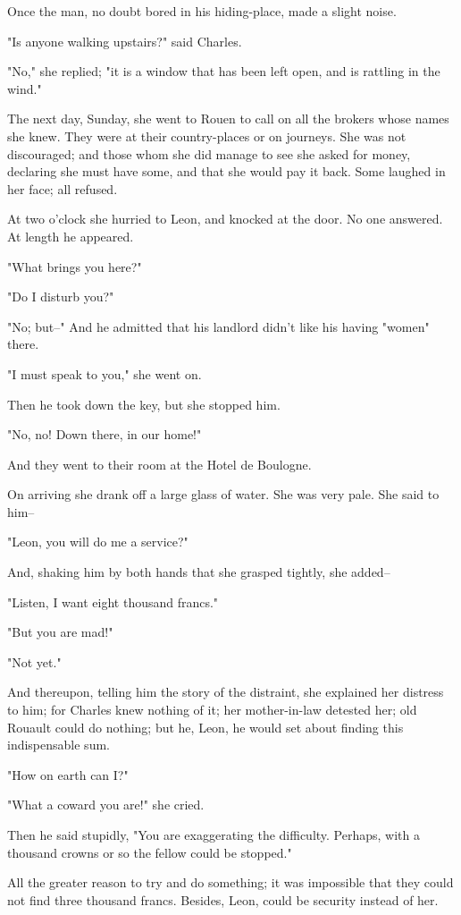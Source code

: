 \documentclass[11pt,twocolumn]{ltugboat}
\begin{document}
Once the man, no doubt bored in his hiding-place, made a slight noise.

"Is anyone walking upstairs?" said Charles.

"No," she replied; "it is a window that has been left open, and is
rattling in the wind."

The next day, Sunday, she went to Rouen to call on all the brokers whose
names she knew. They were at their country-places or on journeys. She
was not discouraged; and those whom she did manage to see she asked for
money, declaring she must have some, and that she would pay it back.
Some laughed in her face; all refused.

At two o'clock she hurried to Leon, and knocked at the door. No one
answered. At length he appeared.

"What brings you here?"

"Do I disturb you?"

"No; but--" And he admitted that his landlord didn't like his having
"women" there.

"I must speak to you," she went on.

Then he took down the key, but she stopped him.

"No, no! Down there, in our home!"

And they went to their room at the Hotel de Boulogne.

On arriving she drank off a large glass of water. She was very pale. She
said to him--

"Leon, you will do me a service?"

And, shaking him by both hands that she grasped tightly, she added--

"Listen, I want eight thousand francs."

"But you are mad!"

"Not yet."

And thereupon, telling him the story of the distraint, she explained
her distress to him; for Charles knew nothing of it; her mother-in-law
detested her; old Rouault could do nothing; but he, Leon, he would set
about finding this indispensable sum.

"How on earth can I?"

"What a coward you are!" she cried.

Then he said stupidly, "You are exaggerating the difficulty. Perhaps,
with a thousand crowns or so the fellow could be stopped."

All the greater reason to try and do something; it was impossible that
they could not find three thousand francs. Besides, Leon, could be
security instead of her.
\end{document}
